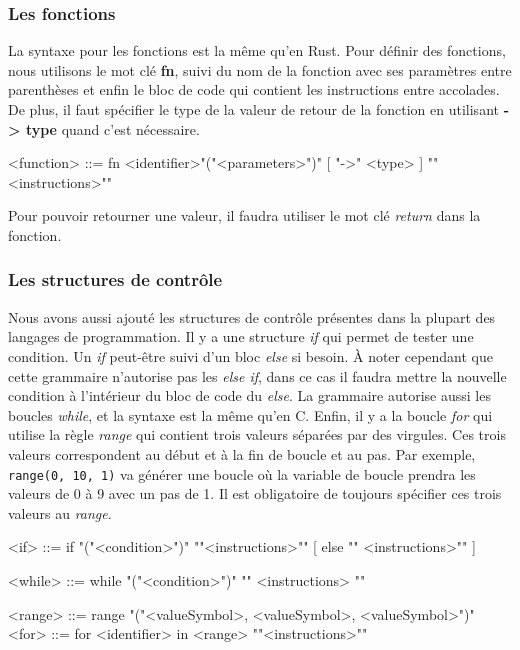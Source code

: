 \documentclass[a4paper]{article}%
\begin{document}
\subsubsection*{Les fonctions}

La syntaxe pour les fonctions est la même qu'en Rust. Pour définir des
fonctions, nous utilisons le mot clé \textbf{fn}, suivi du nom de la fonction
avec ses paramètres entre parenthèses et enfin le bloc de code qui contient
les instructions entre accolades. De plus, il faut spécifier le type de la valeur
de retour de la fonction en utilisant \textbf{-> type} quand c'est nécessaire.

\begin{grammar}
<function> ::= fn <identifier>"("<parameters>")" [ "->" <type> ] "{"<instructions>"}"
\end{grammar}\leavevmode\newline

Pour pouvoir retourner une valeur, il faudra utiliser le mot clé \textit{return}
dans la fonction.

\subsubsection*{Les structures de contrôle}

Nous avons aussi ajouté les structures de contrôle présentes dans la plupart des
langages de programmation. Il y a une structure \textit{if} qui permet de tester
une condition. Un \textit{if} peut-être suivi d'un bloc \textit{else} si
besoin. À noter cependant que cette grammaire n'autorise pas les \textit{else
if}, dans ce cas il faudra mettre la nouvelle condition à l'intérieur du bloc
de code du \textit{else}. La grammaire autorise aussi les boucles
\textit{while}, et la syntaxe est la même qu'en C. Enfin, il y a la boucle
\textit{for} qui utilise la règle \textit{range} qui contient trois valeurs
séparées par des virgules. Ces trois valeurs correspondent au début et à la fin
de boucle et au pas. Par exemple, \lstinline{range(0, 10, 1)} va générer une
boucle où la variable de boucle prendra les valeurs de 0 à 9 avec un pas de 1.
Il est obligatoire de toujours spécifier ces trois valeurs au \textit{range}.

\begin{grammar}
<if> ::= if "("<condition>")" "{"<instructions>"}" [ else "{" <instructions>"}" ]

<while> ::= while "("<condition>")" "{" <instructions> "}"

<range> ::= range "("<valueSymbol>, <valueSymbol>, <valueSymbol>")"
<for> ::= for <identifier> in <range> "{"<instructions>"}"
\end{grammar}\leavevmode\newline
\end{document}
